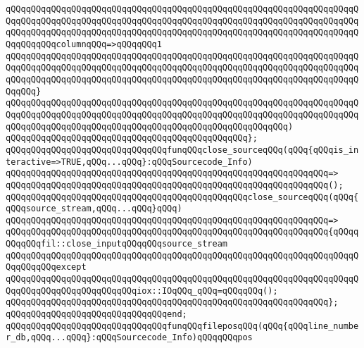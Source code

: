 \verb|qQQqqQQqqQQqqQQqqQQqqQQqqQQqqQQqqQQqqQQqqQQqqQQqqQQqqQQqqQQqqQQqqQQqqQQqqQQqqQQqqQQqqQQqqQQqqQQqqQQqqQQqqQQqqQQqqQQqqQQqqQQqqQQqqQQqqQQqqQQqqQQqqQQqqQQqqQQqqQQqqQQqqQQqqQQqqQQqqQQqqQQqqQQqqQQqqQQqqQQqqQQqqQQqqQQqqQQqqQQqcolumnqQQq=>qQQqqQQq1|\newline
\verb|qQQqqQQqqQQqqQQqqQQqqQQqqQQqqQQqqQQqqQQqqQQqqQQqqQQqqQQqqQQqqQQqqQQqqQQqqQQqqQQqqQQqqQQqqQQqqQQqqQQqqQQqqQQqqQQqqQQqqQQqqQQqqQQqqQQqqQQqqQQqqQQqqQQqqQQqqQQqqQQqqQQqqQQqqQQqqQQqqQQqqQQqqQQqqQQqqQQqqQQqqQQqqQQqqQQqqQQq}|\newline
\verb|qQQqqQQqqQQqqQQqqQQqqQQqqQQqqQQqqQQqqQQqqQQqqQQqqQQqqQQqqQQqqQQqqQQqqQQqqQQqqQQqqQQqqQQqqQQqqQQqqQQqqQQqqQQqqQQqqQQqqQQqqQQqqQQqqQQqqQQqqQQqqQQqqQQqqQQqqQQqqQQqqQQqqQQqqQQqqQQqqQQqqQQqqQQqqQQqqQQq)|\newline
\verb|qQQqqQQqqQQqqQQqqQQqqQQqqQQqqQQqqQQqqQQqqQQqqQQq};|\newline
\newline
\verb|qQQqqQQqqQQqqQQqqQQqqQQqqQQqqQQqfunqQQqclose_sourceqQQq(qQQq{qQQqis_interactive=>TRUE,qQQq...qQQq}:qQQqSourcecode_Info)|\newline
\verb|qQQqqQQqqQQqqQQqqQQqqQQqqQQqqQQqqQQqqQQqqQQqqQQqqQQqqQQqqQQqqQQq=>|\newline
\verb|qQQqqQQqqQQqqQQqqQQqqQQqqQQqqQQqqQQqqQQqqQQqqQQqqQQqqQQqqQQqqQQq();|\newline
\newline
\verb|qQQqqQQqqQQqqQQqqQQqqQQqqQQqqQQqqQQqqQQqqQQqqQQqclose_sourceqQQq(qQQq{qQQqsource_stream,qQQq...qQQq}qQQq)|\newline
\verb|qQQqqQQqqQQqqQQqqQQqqQQqqQQqqQQqqQQqqQQqqQQqqQQqqQQqqQQqqQQqqQQq=>|\newline
\verb|qQQqqQQqqQQqqQQqqQQqqQQqqQQqqQQqqQQqqQQqqQQqqQQqqQQqqQQqqQQqqQQq{qQQqqQQqqQQqfil::close_inputqQQqqQQqsource_stream|\newline
\verb|qQQqqQQqqQQqqQQqqQQqqQQqqQQqqQQqqQQqqQQqqQQqqQQqqQQqqQQqqQQqqQQqqQQqqQQqqQQqqQQqexcept|\newline
\verb|qQQqqQQqqQQqqQQqqQQqqQQqqQQqqQQqqQQqqQQqqQQqqQQqqQQqqQQqqQQqqQQqqQQqqQQqqQQqqQQqqQQqqQQqqQQqqQQqiox::IOqQQq_qQQq=qQQqqQQq();|\newline
\verb|qQQqqQQqqQQqqQQqqQQqqQQqqQQqqQQqqQQqqQQqqQQqqQQqqQQqqQQqqQQqqQQq};|\newline
\verb|qQQqqQQqqQQqqQQqqQQqqQQqqQQqqQQqend;|\newline
\newline
\verb|qQQqqQQqqQQqqQQqqQQqqQQqqQQqqQQqfunqQQqfileposqQQq(qQQq{qQQqline_number_db,qQQq...qQQq}:qQQqSourcecode_Info)qQQqqQQqpos|\newline
